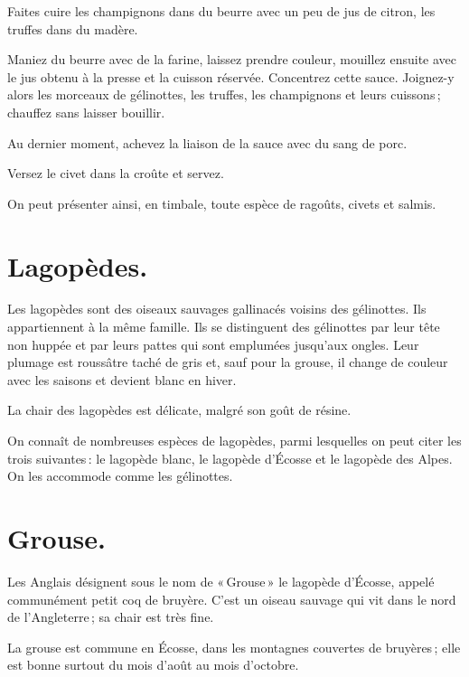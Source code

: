 Faites cuire les champignons dans du beurre avec un peu de jus de citron, les
truffes dans du madère.

Maniez du beurre avec de la farine, laissez prendre couleur, mouillez ensuite
avec le jus obtenu à la presse et la cuisson réservée. Concentrez cette sauce.
Joignez-y alors les morceaux de gélinottes, les truffes, les champignons et
leurs cuissons ; chauffez sans laisser bouillir.

Au dernier moment, achevez la liaison de la sauce avec du sang de porc.

Versez le civet dans la croûte et servez.

\sk

On peut présenter ainsi, en timbale, toute espèce de ragoûts, civets et salmis.

\section*{\centering Lagopèdes.}
{}

Les lagopèdes sont des oiseaux sauvages gallinacés voisins des gélinottes. Ils
appartiennent à la même famille. Ils se distinguent des gélinottes par leur
tête non huppée et par leurs pattes qui sont emplumées jusqu'aux ongles. Leur
plumage est roussâtre taché de gris et, sauf pour la grouse, il change de
couleur avec les saisons et devient blanc en hiver.

La chair des lagopèdes est délicate, malgré son goût de résine.

On connaît de nombreuses espèces de lagopèdes, parmi lesquelles on peut citer
les trois suivantes : le lagopède blanc, le lagopède d'Écosse et le lagopède
des Alpes. On les accommode comme les gélinottes.

\section*{\centering Grouse.}
{}

Les Anglais désignent sous le nom de « Grouse » le lagopède d'Écosse, appelé
communément petit coq de bruyère. C'est un oiseau sauvage qui vit dans le nord
de l'Angleterre ; sa chair est très fine.

La grouse est commune en Écosse, dans les montagnes couvertes de bruyères ;
elle est bonne surtout du mois d'août au mois d'octobre.


